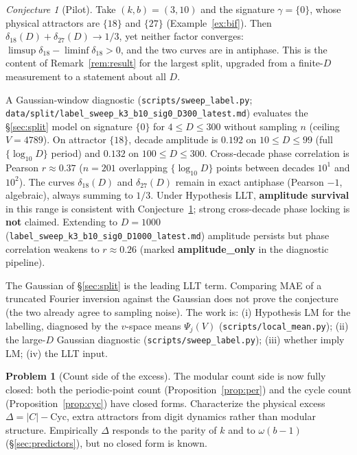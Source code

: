 \documentclass[11pt]{article}
\theoremstyle{definition}
\newtheorem{problem}[theorem]{Problem}
\theoremstyle{remark}
\newtheorem{conjecture}[theorem]{Conjecture}
\newcommand{\Cyc}{\mathrm{Cyc}}
\begin{document}
\begin{conjecture}[Pilot]\label{con:splitpilot}
Take $(k,b)=(3,10)$ and the signature $\gamma=\{0\}$, whose physical attractors are $\{18\}$ and $\{27\}$ (Example~\ref{ex:bif}). Then $\delta_{18}(D)+\delta_{27}(D)\to 1/3$, yet neither factor converges: $\limsup\delta_{18}-\liminf\delta_{18}>0$, and the two curves are in antiphase. This is the content of Remark~\ref{rem:result} for the largest split, upgraded from a finite-$D$ measurement to a statement about all $D$.

A Gaussian-window diagnostic (\texttt{scripts/sweep\_label.py}; \texttt{data/split/label\_sweep\_k3\_b10\_sig0\_D300\_latest.md}) evaluates the \S\ref{sec:split} model on signature $\{0\}$ for $4 \le D \le 300$ without sampling $n$ (ceiling $V=4789$). On attractor $\{18\}$, decade amplitude is $0.192$ on $10 \le D \le 99$ (full $\{\log_{10} D\}$ period) and $0.132$ on $100 \le D \le 300$. Cross-decade phase correlation is Pearson $r \approx 0.37$ ($n=201$ overlapping $\{\log_{10} D\}$ points between decades $10^1$ and $10^2$). The curves $\delta_{18}(D)$ and $\delta_{27}(D)$ remain in exact antiphase (Pearson $-1$, algebraic), always summing to $1/3$. Under Hypothesis LLT, \textbf{amplitude survival} in this range is consistent with Conjecture~\ref{con:splitpilot}; strong cross-decade phase locking is \textbf{not} claimed. Extending to $D=1000$ (\texttt{label\_sweep\_k3\_b10\_sig0\_D1000\_latest.md}) amplitude persists but phase correlation weakens to $r \approx 0.26$ (marked \textbf{amplitude\_only} in the diagnostic pipeline).
\end{conjecture}

The Gaussian of \S\ref{sec:split} is the leading LLT term. Comparing MAE of a truncated Fourier inversion against the Gaussian does not prove the conjecture (the two already agree to sampling noise). The work is: (i) Hypothesis LM for the labelling, diagnosed by the $v$-space means $\Psi_j(V)$ (\texttt{scripts/local\_mean.py}); (ii) the large-$D$ Gaussian diagnostic (\texttt{scripts/sweep\_label.py}); (iii) whether \cite{delange,drmota-poly,drmota-grabner} imply LM; (iv) the LLT input.

\begin{problem}[Count side of the excess]\label{prob:excess}
The modular count side is now fully closed: both the periodic-point count (Proposition~\ref{prop:per}) and the cycle count (Proposition~\ref{prop:cyc}) have closed forms. Characterize the physical excess $\Delta = |C| - \Cyc$, extra attractors from digit dynamics rather than modular structure. Empirically $\Delta$ responds to the parity of $k$ and to $\omega(b-1)$ (\S\ref{sec:predictors}), but no closed form is known.
\end{problem}
\end{document}
